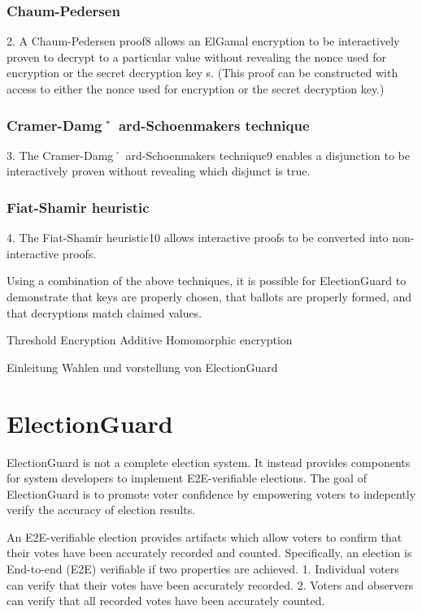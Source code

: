 \subsubsection{Chaum-Pedersen}
2. A Chaum-Pedersen proof8 allows an ElGamal
encryption to be interactively proven to decrypt to a particular value without revealing the nonce used for encryption
or the secret decryption key s. (This proof can be constructed with access to either the nonce used for encryption or
the secret decryption key.) \cite[6]{eg-spec}
\subsubsection{Cramer-Damg˚ ard-Schoenmakers technique}
3. The Cramer-Damg˚ ard-Schoenmakers technique9 enables a disjunction to be interactively
proven without revealing which disjunct is true.
\subsubsection{Fiat-Shamir heuristic}
4. The Fiat-Shamir heuristic10 allows interactive proofs to be
converted into non-interactive proofs. \cite[6]{eg-spec}

Using a combination of the above techniques, it is possible for ElectionGuard to
demonstrate that keys are properly chosen, that ballots are properly formed, and that decryptions match claimed values.
\cite[6]{eg-spec}

Threshold Encryption
Additive Homomorphic encryption


Einleitung Wahlen und vorstellung von ElectionGuard

\section{ElectionGuard}



ElectionGuard is not a complete election system. It instead provides components for system developers to implement
E2E-verifiable elections. The goal of ElectionGuard is to promote voter confidence by empowering voters to
indepently verify the accuracy of election results. \cite[1]{eg-spec}

An E2E-verifiable election provides artifacts which allow voters to confirm that their votes have been accurately
recorded and counted. Specifically, an election is End-to-end (E2E) verifiable if two properties are achieved. 1.
Individual voters can verify that their votes have been accurately recorded. 2. Voters and observers can verify that all
recorded votes have been accurately counted.\cite[1]{eg-spec}

